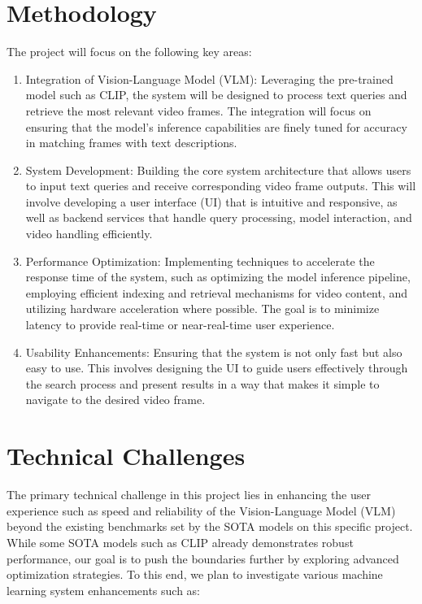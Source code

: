\documentclass[11pt]{article}
\begin{document}
\section{Methodology}
The project will focus on the following key areas:
\begin{enumerate}
    \item Integration of Vision-Language Model (VLM): Leveraging the pre-trained model such as CLIP, the system will be designed to process text queries and retrieve the most relevant video frames. The integration will focus on ensuring that the model's inference capabilities are finely tuned for accuracy in matching frames with text descriptions.
    
    \item System Development: Building the core system architecture that allows users to input text queries and receive corresponding video frame outputs. This will involve developing a user interface (UI) that is intuitive and responsive, as well as backend services that handle query processing, model interaction, and video handling efficiently.
    
    \item Performance Optimization: Implementing techniques to accelerate the response time of the system, such as optimizing the model inference pipeline, employing efficient indexing and retrieval mechanisms for video content, and utilizing hardware acceleration where possible. The goal is to minimize latency to provide real-time or near-real-time user experience.
    
    \item Usability Enhancements: Ensuring that the system is not only fast but also easy to use. This involves designing the UI to guide users effectively through the search process and present results in a way that makes it simple to navigate to the desired video frame.
\end{enumerate}

\section{Technical Challenges}
The primary technical challenge in this project lies in enhancing the user experience such as speed and reliability of the Vision-Language Model (VLM) beyond the existing benchmarks set by the SOTA models on this specific project. While some SOTA models such as CLIP already demonstrates robust performance, our goal is to push the boundaries further by exploring advanced optimization strategies. To this end, we plan to investigate various machine learning system enhancements such as:
\end{document}
